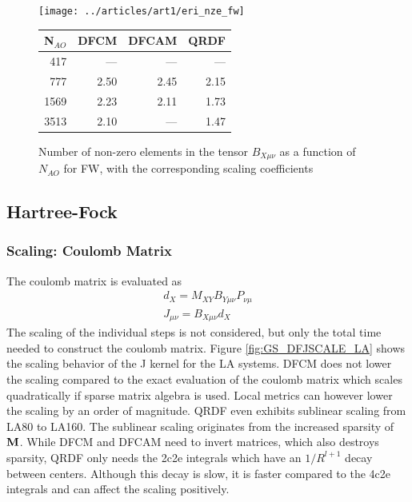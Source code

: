 \begin{figure}
\begin{minipage}{0.5\textwidth}
\centering
\texttt{[image: ../articles/art1/eri\_nze\_fw]}
\end{minipage}
\begin{minipage}{0.4\textwidth}
\centering
\begin{tabular}{rrrr}
\hline
N$_{AO}$ & DFCM & DFCAM & QRDF \\ \hline
417 & --- & --- & --- \\ 
777 & 2.50 & 2.45 & 2.15 \\ 
1569 & 2.23 & 2.11 & 1.73 \\ 
3513 & 2.10 & --- & 1.47 \\ \hline
\end{tabular}
\end{minipage}
\caption{Number of non-zero elements in the tensor $B_{X\mu\nu}$ as a function of $N_{AO}$ for FW, with the corresponding scaling coefficients}
\label{fig:GS_BNZE_FW}
\end{figure}

\subsection{Hartree-Fock}

\subsubsection{Scaling: Coulomb Matrix}

The coulomb matrix is evaluated as
\begin{align}
d_X = M_{XY} B_{Y\mu\nu} P_{\nu\mu} \\
J_{\mu\nu} = B_{X\mu\nu} d_X
\end{align}
\noindent The scaling of the individual steps is not considered, but only the total time needed to construct the coulomb matrix. Figure \ref{fig:GS_DFJSCALE_LA} shows the scaling behavior of the J kernel for the LA systems. DFCM does not lower the scaling compared to the exact evaluation of the coulomb matrix which scales quadratically if sparse matrix algebra is used. Local metrics can however lower the scaling by an order of magnitude. QRDF even exhibits sublinear scaling from LA80 to LA160. The sublinear scaling originates from the increased sparsity of $\mathbf{M}$. While DFCM and DFCAM need to invert matrices, which also destroys sparsity, QRDF only needs the 2c2e integrals which have an $1/R^{l+1}$ decay between centers. Although this decay is slow, it is faster compared to the 4c2e integrals and can affect the scaling positively.

